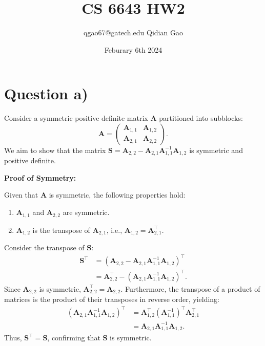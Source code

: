\documentclass{article}
\title{CS 6643 HW2}
\author{qgao67@gatech.edu Qidian Gao}
\date{Feburary 6th 2024}
\begin{document}
\maketitle
\section{Question a)}
Consider a symmetric positive definite matrix $\boldsymbol{A}$ partitioned into subblocks:
\begin{equation}
\boldsymbol{A} = \begin{pmatrix}
\boldsymbol{A}_{1,1} & \boldsymbol{A}_{1,2} \\
\boldsymbol{A}_{2,1} & \boldsymbol{A}_{2,2}
\end{pmatrix}.
\end{equation}
We aim to show that the matrix $\boldsymbol{S} = \boldsymbol{A}_{2,2} - \boldsymbol{A}_{2,1} \boldsymbol{A}_{1,1}^{-1} \boldsymbol{A}_{1,2}$ is symmetric and positive definite.

\textbf{Proof of Symmetry:}

Given that $\boldsymbol{A}$ is symmetric, the following properties hold:
\begin{enumerate}
    \item $\boldsymbol{A}_{1,1}$ and $\boldsymbol{A}_{2,2}$ are symmetric.
    \item $\boldsymbol{A}_{1,2}$ is the transpose of $\boldsymbol{A}_{2,1}$, i.e., $\boldsymbol{A}_{1,2} = \boldsymbol{A}_{2,1}^\top$.
\end{enumerate}

Consider the transpose of $\boldsymbol{S}$:
\begin{align}
\boldsymbol{S}^\top &= \left(\boldsymbol{A}_{2,2} - \boldsymbol{A}_{2,1} \boldsymbol{A}_{1,1}^{-1} \boldsymbol{A}_{1,2}\right)^\top \\
&= \boldsymbol{A}_{2,2}^\top - \left(\boldsymbol{A}_{2,1} \boldsymbol{A}_{1,1}^{-1} \boldsymbol{A}_{1,2}\right)^\top.
\end{align}
Since $\boldsymbol{A}_{2,2}$ is symmetric, $\boldsymbol{A}_{2,2}^\top = \boldsymbol{A}_{2,2}$. Furthermore, the transpose of a product of matrices is the product of their transposes in reverse order, yielding:
\begin{align}
\left(\boldsymbol{A}_{2,1} \boldsymbol{A}_{1,1}^{-1} \boldsymbol{A}_{1,2}\right)^\top &= \boldsymbol{A}_{1,2}^\top\left(\boldsymbol{A}_{1,1}^{-1}\right)^\top \boldsymbol{A}_{2,1}^\top \\
&= \boldsymbol{A}_{2,1} \boldsymbol{A}_{1,1}^{-1} \boldsymbol{A}_{1,2}.
\end{align}
Thus, $\boldsymbol{S}^\top = \boldsymbol{S}$, confirming that $\boldsymbol{S}$ is symmetric.
\end{document}
